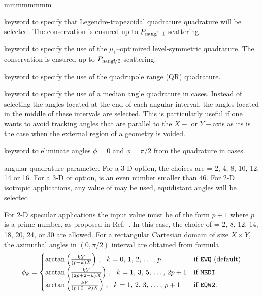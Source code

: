 \begin{ListeDeDescription}{mmmmmmmm}
\item[\moc{SMS}] keyword to specify that Legendre-trapezoidal quadrature quadrature will be selected.\cite{sms} The conservation is ensured up to $P_{\dusa{nangl}-1}$ scattering.

\item[\moc{LSN}] keyword to specify the use of the $\mu_1$--optimized level-symmetric quadrature. The conservation is ensured up to $P_{\dusa{nangl}/2}$ scattering.

\item[\moc{QRN}] keyword to specify the use of the quadrupole range (QR) quadrature.\cite{quadrupole}

\item[\moc{MEDI}] keyword to specify the use of a median angle quadrature in  cases. Instead of
selecting the angles located at the end of each angular interval, the angles located in the middle of
these intervals are selected. This is particularly useful if one wants to avoid
tracking angles that are parallel to the $X-$ or $Y-$axis as its is the case
when the external region of a  geometry is voided.

\item[\moc{EQW2}] keyword to eliminate angles $\phi=0$ and $\phi=\pi/2$ from the  quadrature in  cases.

\item[\dusa{nangl}] angular quadrature parameter. For a 3-D  option, the choices are  = 2, 4, 8, 10, 12, 14 
or 16. For a 3-D  or  option,  is an even number smaller than 46.\cite{ige260} For 2-D 
isotropic applications, any value of  may be used, equidistant angles will be selected.

For 2-D specular applications the input value must be of the form $p + 1$ where $p$ is a prime number, as proposed
in Ref.~. In this case, the choice of  = 2, 8, 12, 14, 18, 20, 24, or 30 are allowed. For
a rectangular Cartesian domain of size $X \times Y$, the azimuthal angles in $(0,\pi/2)$ interval are obtained from formula
\begin{align*}
\phi_k=\begin{cases}
\arctan\left(\frac{kY}{(p-k)X}\right)  \, , \ \ k=0,\, 1,\, 2,\, \dots, \, p & \text{if {\tt EWQ} (default)}\\
\arctan\left(\frac{kY}{(2p+2-k)X}\right) \, , \ \ k=1,\, 3,\, 5, \, \dots, \, 2p+1 & \text{if {\tt MEDI}} \\
\arctan\left(\frac{kY}{(p+2-k)X}\right) \, , \ \ k=1,\, 2,\, 3, \, \dots, \, p+1 &\text{if {\tt EQW2}.}\\
\end{cases}
\end{align*}


\end{ListeDeDescription}
